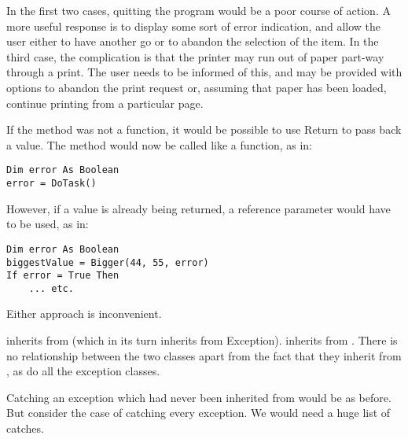 		\begin{stab}
			\begin{enumChapter}
				\item In the first two cases, quitting the program would be a poor course of action. A more useful response is to display some sort of error indication, and allow the user either to have another go or to abandon the selection of the item. In the third case, the complication is that the printer may run out of paper part-way through a print. The user needs to be informed of this, and may be provided with options to abandon the print request or, assuming that paper has been loaded, continue printing from a particular page.
				\item	If the method was not a function, it would be possible to use Return to pass back a  value. The method would now be called like a function, as in:
					\begin{lstlisting}
Dim error As Boolean
error = DoTask()
					\end{lstlisting}
					However, if a value is already being returned, a reference parameter would have to be used, as in:
					\begin{lstlisting}
Dim error As Boolean
biggestValue = Bigger(44, 55, error)
If error = True Then
	... etc.
					\end{lstlisting}
					Either approach is inconvenient.
				\item	{} inherits from  (which in its turn inherits from Exception).  inherits from . There is no relationship between the two classes apart from the fact that they inherit from , as do all the exception classes.
				\item	Catching an exception which had never been inherited from would be as before. But consider the case of catching every exception. We would need a huge list of catches.
			\end{enumChapter}
		\end{stab}

